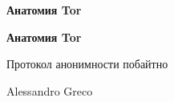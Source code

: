 \documentclass[11pt,openright,twoside]{book}
\begin{document}
\frontmatter
\thispagestyle{empty}
\null\vfill
\begin{center}{\LARGE\bfseries Анатомия Tor\par}\end{center}
\vfill\vfill
\cleardoublepage
\thispagestyle{empty}
\begin{center}
\vspace*{2.5cm}
{\Huge\bfseries Анатомия Tor\par}
\vspace{0.9cm}
{\Large Протокол анонимности побайтно\par}
\vspace{3.5cm}
{\Large Alessandro Greco\par}
\vfill
\end{center}
\clearpage
\thispagestyle{empty}
\null\vfill
\Colophon
\cleardoublepage
\tableofcontents

\mainmatter

\backmatter
\printbibliography[heading=bibintoc,title={Литература}]
\printindex
\end{document}
